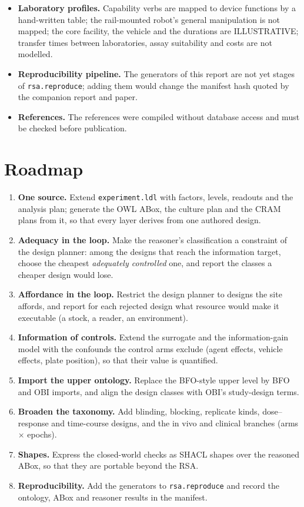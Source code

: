 \documentclass[10pt,a4paper]{article}
\begin{document}
\begin{itemize}
\item \textbf{Laboratory profiles.} Capability verbs are mapped to device functions by a hand-written table; the
  rail-mounted robot's general manipulation is not mapped; the core facility, the vehicle and the durations are
  ILLUSTRATIVE; transfer times between laboratories, assay suitability and costs are not modelled.
\item \textbf{Reproducibility pipeline.} The generators of this report are not yet stages of \texttt{rsa.reproduce};
  adding them would change the manifest hash quoted by the companion report and paper.
\item \textbf{References.} The references were compiled without database access and must be checked before
  publication.
\end{itemize}


\section{Roadmap}\label{sec:roadmap}
\begin{enumerate}
\item \textbf{One source.} Extend \texttt{experiment.ldl} with factors, levels, readouts and the analysis plan; generate
  the OWL ABox, the culture plan and the CRAM plans from it, so that every layer derives from one authored design.
\item \textbf{Adequacy in the loop.} Make the reasoner's classification a constraint of the design planner: among the
  designs that reach the information target, choose the cheapest \emph{adequately controlled} one, and report the
  classes a cheaper design would lose.
\item \textbf{Affordance in the loop.} Restrict the design planner to designs the site affords, and report for
  each rejected design what resource would make it executable (a stock, a reader, an environment).
\item \textbf{Information of controls.} Extend the surrogate and the information-gain model with the confounds the
  control arms exclude (agent effects, vehicle effects, plate position), so that their value is quantified.
\item \textbf{Import the upper ontology.} Replace the BFO-style upper level by BFO and OBI imports, and align the design
  classes with OBI's study-design terms.
\item \textbf{Broaden the taxonomy.} Add blinding, blocking, replicate kinds, dose--response and time-course designs,
  and the in vivo and clinical branches (arms $\times$ epochs).
\item \textbf{Shapes.} Express the closed-world checks as SHACL shapes over the reasoned ABox, so that they are
  portable beyond the RSA.
\item \textbf{Reproducibility.} Add the generators to \texttt{rsa.reproduce} and record the ontology, ABox and reasoner
  results in the manifest.
\end{enumerate}
\end{document}
